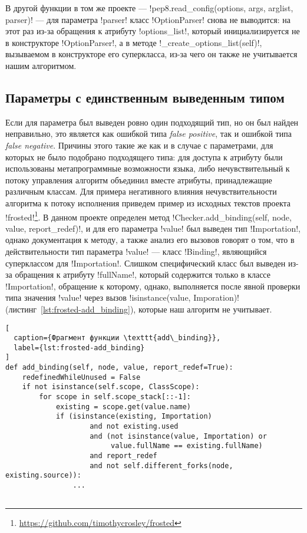 В другой функции в том же проекте --- 
!pep8.read_config(options, args, arglist, parser)!
--- для параметра !parser!
класс !OptionParser! снова не выводится: на этот раз из-за обращения к атрибуту
!options_list!, который инициализируется не в конструкторе !OptionParser!, а в
методе !_create_options_list(self)!, вызываемом в конструкторе его суперкласса,
из-за чего он также не учитывается нашим алгоритмом.

\subsection{Параметры с единственным выведенным типом}
\label{sub:single-type-parameters}

Если для параметра был выведен ровно один подходящий тип, но он был найден
неправильно, это является как ошибкой типа \emph{false positive}, так и ошибкой типа
\emph{false negative}. Причины этого такие же как и в случае с параметрами, для
которых не было подобрано подходящего типа: для доступа к атрибуту были
использованы метапрограммные возможности языка, либо нечувствительный к потоку
управления алгоритм объединил вместе атрибуты, принадлежащие различным классам.
Для примера негативного влияния нечувствительности алгоритма к потоку исполнения
приведем пример из исходных текстов проекта
!frosted!\footnote{\url{https://github.com/timothycrosley/frosted}}. В данном
проекте определен метод !Checker.add_binding(self, node, value, report_redef)!, 
и для его параметра !value! был выведен тип !Importation!, однако документация к
методу, а также анализ его вызовов говорят о том, что в действительности тип
параметра !value! --- класс !Binding!, являющийся суперклассом для
!Importation!. Слишком специфический класс был выведен из-за обращения к
атрибуту !fullName!, который содержится только в классе !Importation!, обращение
к которому, однако, выполняется после явной проверки типа значения !value! через
вызов !isinstance(value, Imporation)! (листинг~\ref{lst:frosted-add_binding}),
которые наш алгоритм не учитывает. 

\begin{lstlisting}[
  caption={Фрагмент функции \texttt{add\_binding}},
  label={lst:frosted-add_binding}
]
def add_binding(self, node, value, report_redef=True):
    redefinedWhileUnused = False
    if not isinstance(self.scope, ClassScope):
        for scope in self.scope_stack[::-1]:
            existing = scope.get(value.name)
            if (isinstance(existing, Importation)
                    and not existing.used
                    and (not isinstance(value, Importation) or
                         value.fullName == existing.fullName)
                    and report_redef
                    and not self.different_forks(node, existing.source)):
                ...
    
\end{lstlisting}

